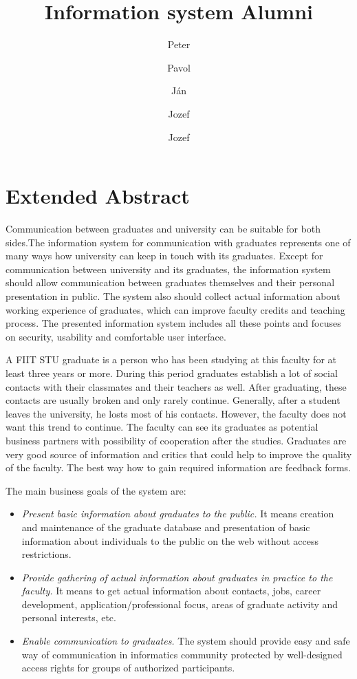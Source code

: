\documentclass{iitsrc}
\title{Information system Alumni}
\author{Peter}{C\'ich}
\author{Pavol}{F\'abik}
\author{J\'an}{Garaj}
\author{Jozef}{Hergott}
\author{Jozef}{Hopko}
\begin{document}
\section*{Extended Abstract}

Communication between graduates and university can be suitable for both sides.The information system for communication with graduates represents one of many ways how university can keep in touch with its graduates. Except for communication between university and its graduates, the information system should allow communication between graduates themselves and their personal presentation in public. The system also should collect actual information about working experience of graduates, which can improve faculty credits and teaching process. The presented information system includes all these points and focuses on security, usability and comfortable user interface.




A FIIT STU graduate is a person who has been studying at this faculty for at least three years or more. During this period graduates establish a lot of social contacts with their classmates and their teachers as well. After graduating, these contacts are usually broken and only rarely continue. Generally, after a student leaves the university, he losts most of his contacts. However, the faculty does not want this trend to continue. The faculty can see its graduates as potential business partners with possibility of cooperation after the studies. Graduates are very good source of information and critics that could help to improve the quality of the faculty. The best way how to gain required information are feedback forms.

The main business goals of the system are:

\begin{itemize}
\item {\em Present basic information about graduates to the public.}
It means creation and maintenance of the graduate database and presentation of basic information about individuals to the public on the web without access restrictions.

\item {\em Provide gathering of actual information about graduates in practice to the faculty.} 
It means to get actual information about contacts, jobs, career development, application/professional focus, areas of graduate activity and personal interests, etc.

\item {\em Enable communication to graduates.}
The system should provide easy and safe way of communication in informatics community protected by well-designed access rights for groups of authorized participants.
\end{itemize}
\end{document}
